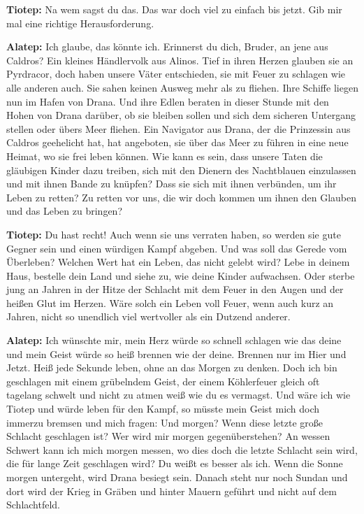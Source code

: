 \documentclass[a5paper,6pt]{book}
\begin{document}
\textbf{Tiotep:} Na wem sagst du das. Das war doch viel zu einfach bis jetzt. Gib mir mal eine richtige
Herausforderung.

\textbf{Alatep:} Ich glaube, das könnte ich. Erinnerst du dich, Bruder, an jene aus Caldros? Ein
kleines Händlervolk aus Alinos. Tief in ihren Herzen glauben sie an Pyrdracor, doch
haben unsere Väter entschieden, sie mit Feuer zu schlagen wie alle anderen auch.
Sie sahen keinen Ausweg mehr als zu fliehen. Ihre Schiffe liegen nun im Hafen von
Drana. Und ihre Edlen beraten in dieser Stunde mit den Hohen von Drana darüber, ob
sie bleiben sollen und sich dem sicheren Untergang stellen oder übers Meer fliehen.
Ein Navigator aus Drana, der die Prinzessin aus Caldros geehelicht hat, hat angeboten,
sie über das Meer zu führen in eine neue Heimat, wo sie frei leben können. Wie kann
es sein, dass unsere Taten die gläubigen Kinder dazu treiben, sich mit den Dienern des
Nachtblauen einzulassen und mit ihnen Bande zu knüpfen? Dass sie sich mit ihnen
verbünden, um ihr Leben zu retten? Zu retten vor uns, die wir doch kommen um ihnen
den Glauben und das Leben zu bringen?

\textbf{Tiotep:} Du hast recht! Auch wenn sie uns verraten haben, so werden sie gute Gegner sein und
einen würdigen Kampf abgeben. Und was soll das Gerede vom Überleben? Welchen
Wert hat ein Leben, das nicht gelebt wird? Lebe in deinem Haus, bestelle dein Land
und siehe zu, wie deine Kinder aufwachsen. Oder sterbe jung an Jahren in der Hitze
der Schlacht mit dem Feuer in den Augen und der heißen Glut im Herzen. Wäre solch
ein Leben voll Feuer, wenn auch kurz an Jahren, nicht so unendlich viel wertvoller als
ein Dutzend anderer.

\textbf{Alatep:} Ich wünschte mir, mein Herz würde so schnell schlagen wie das deine und mein Geist
würde so heiß brennen wie der deine. Brennen nur im Hier und Jetzt. Heiß jede
Sekunde leben, ohne an das Morgen zu denken. Doch ich bin geschlagen mit einem
grübelndem Geist, der einem Köhlerfeuer gleich oft tagelang schwelt und nicht zu
atmen weiß wie du es vermagst. Und wäre ich wie Tiotep und würde leben für den
Kampf, so müsste mein Geist mich doch immerzu bremsen und mich fragen: Und
morgen? Wenn diese letzte große Schlacht geschlagen ist? Wer wird mir morgen
gegenüberstehen? An wessen Schwert kann ich mich morgen messen, wo dies doch
die letzte Schlacht sein wird, die für lange Zeit geschlagen wird? Du weißt es besser
als ich. Wenn die Sonne morgen untergeht, wird Drana besiegt sein. Danach steht nur
noch Sundan und dort wird der Krieg in Gräben und hinter Mauern geführt und nicht
auf dem Schlachtfeld.
\end{document}
